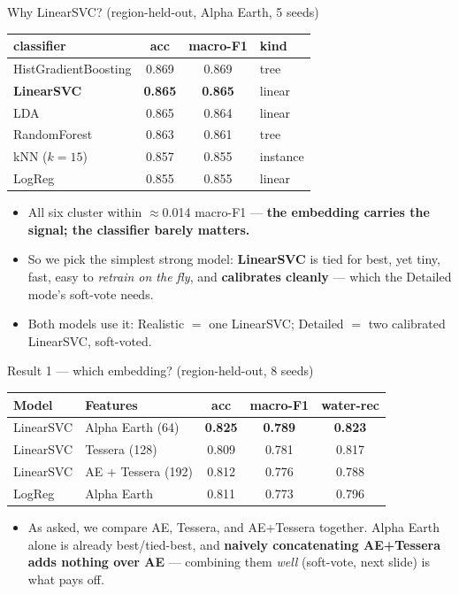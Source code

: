 \documentclass[aspectratio=169]{beamer}
\begin{document}
\begin{frame}{Why LinearSVC? (region-held-out, Alpha Earth, 5 seeds)}
\centering
\small
\begin{tabular}{l c c l}
\toprule
\textbf{classifier} & \textbf{acc} & \textbf{macro-F1} & \textbf{kind} \\
\midrule
HistGradientBoosting & 0.869 & 0.869 & tree \\
\textbf{LinearSVC}   & \textbf{0.865} & \textbf{0.865} & linear \\
LDA                  & 0.865 & 0.864 & linear \\
RandomForest         & 0.863 & 0.861 & tree \\
kNN ($k{=}15$)       & 0.857 & 0.855 & instance \\
LogReg               & 0.855 & 0.855 & linear \\
\bottomrule
\end{tabular}
\vspace{0.8em}
\flushleft
\begin{itemize}\small
  \item All six cluster within $\approx$0.014 macro-F1 --- \textbf{the embedding
  carries the signal; the classifier barely matters.}
  \item So we pick the simplest strong model: \textbf{LinearSVC} is tied for best,
  yet tiny, fast, easy to \emph{retrain on the fly}, and \textbf{calibrates cleanly}
  --- which the Detailed mode's soft-vote needs.
  \item Both models use it: Realistic $=$ one LinearSVC; Detailed $=$ two calibrated
  LinearSVC, soft-voted.
\end{itemize}
\end{frame}

\begin{frame}{Result 1 --- which embedding? (region-held-out, 8 seeds)}
\centering
\small
\begin{tabular}{l l c c c}
\toprule
\textbf{Model} & \textbf{Features} & \textbf{acc} & \textbf{macro-F1} & \textbf{water-rec} \\
\midrule
LinearSVC & Alpha Earth (64)   & \textbf{0.825} & \textbf{0.789} & \textbf{0.823} \\
LinearSVC & Tessera (128)      & 0.809 & 0.781 & 0.817 \\
LinearSVC & AE + Tessera (192) & 0.812 & 0.776 & 0.788 \\
LogReg    & Alpha Earth        & 0.811 & 0.773 & 0.796 \\
\bottomrule
\end{tabular}
\vspace{1em}
\begin{itemize}\small
  \item As asked, we compare AE, Tessera, and AE+Tessera together. Alpha Earth alone
  is already best/tied-best, and \textbf{naively concatenating AE+Tessera adds
  nothing over AE} --- combining them \emph{well} (soft-vote, next slide) is what
  pays off.
\end{itemize}
\end{frame}
\end{document}
